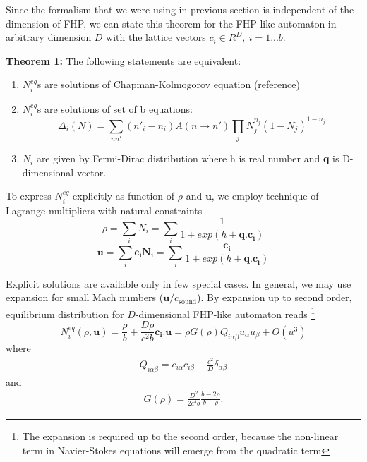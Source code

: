 \bigskip
Since the formalism that we were using in previous section is independent of the dimension of FHP, we can state this theorem for the FHP-like automaton in arbitrary dimension $D$ with the lattice vectors $c_i \in R^D,~i=1...b$.

\bigskip

\textbf{Theorem 1:}
The following statements are equivalent:
\begin{enumerate}
\item $N_i^{eq}$s are solutions of Chapman-Kolmogorov equation (reference)\\
\item $N_i^{eq}$s are solutions of set of b equations:
\begin{equation}
\Delta_i(N) = \sum_{nn'}(n'_i - n_i)A(n \rightarrow n')\prod_j N_j^{n_j}(1-N_j)^{1-n_j}
\end{equation} 

\item $N_i$ are given by Fermi-Dirac distribution
where h is real number and \textbf{q} is D-dimensional vector.
\end{enumerate}

\bigskip

To express $N_i^{eq}$ explicitly as function of $\rho$ and $\bm{u}$, we employ technique of Lagrange multipliers with natural constraints
\begin{equation}
\rho = \sum_i N_i = \sum_i \frac{1}{1+ exp(h + \bm{q}.\bm{c_i})}
\end{equation}
\begin{equation}
\bm{u} = \sum_i \bm{c_i} \bm{N_i} = \sum_i \frac{\bm{c_i}}{1+ exp(h + \bm{q}.\bm{c_i})}
\end{equation}

Explicit solutions are available only in few special cases.
In general, we may use expansion for small Mach numbers ($\bm{u}/c_{\mathrm{sound}}$). By expansion up to second order, equilibrium distribution for $D$-dimensional FHP-like automaton reads \footnote{The expansion is required up to the second order, because the non-linear term in Navier-Stokes equations will emerge from the quadratic term}
\begin{equation} \label{eou}
N_i^{eq}(\rho,\bm{u}) = \frac{\rho}{b} + \frac{D\rho}{c^2 b}\bm{c_i}.\bm{u} = \rho G(\rho) Q_{i\alpha\beta}u_{\alpha}u_{\beta} + O(u^3)
\end{equation}
where 
\begin{align}
Q_{i\alpha\beta} = c_{i\alpha} c_{i\beta} - \frac{c^2}{D} \delta_{\alpha\beta}
\end{align}
and
\begin{align}
G(\rho) = \frac{D^2}{2c^4b}\frac{b-2\rho}{b-\rho}.
\end{align}

